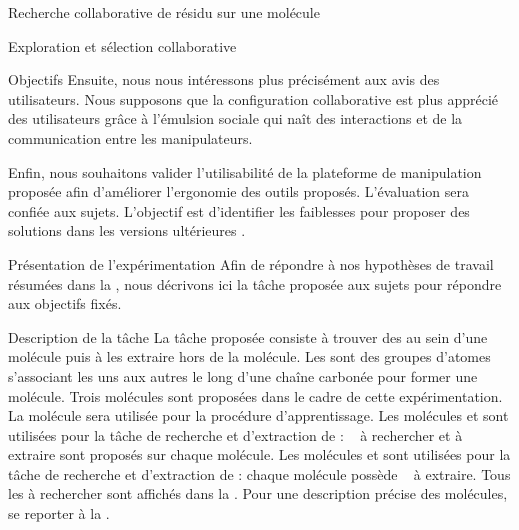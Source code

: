 \documentclass[myfrancais,ngerman,english,frenchb]{mythesis}
\begin{document}
\begin{mychapter}{Recherche collaborative de résidu sur une molécule}
\begin{mysection}{Exploration et sélection collaborative}
\begin{mysubsection}{Objectifs}
				Ensuite, nous nous intéressons plus précisément aux avis des utilisateurs.
				Nous supposons que la configuration collaborative est plus apprécié des utilisateurs grâce à l'émulsion sociale qui naît des interactions et de la communication entre les manipulateurs.

				Enfin, nous souhaitons valider l'utilisabilité de la plateforme de manipulation proposée afin d'améliorer l'ergonomie des outils proposés.
				L'évaluation sera confiée aux sujets.
				L'objectif est d'identifier les faiblesses pour proposer des solutions dans les versions ultérieures \myShaddock.
			\end{mysubsection}
		\end{mysection}
		\begin{mysection}{Présentation de l'expérimentation}
			Afin de répondre à nos hypothèses de travail résumées dans la , nous décrivons ici la tâche proposée aux sujets pour répondre aux objectifs fixés.
			\begin{mysubsection}{Description de la tâche}
				La tâche proposée consiste à trouver des  au sein d'une molécule puis à les extraire hors de la molécule.
				Les  sont des groupes d'atomes s'associant les uns aux autres le long d'une chaîne carbonée pour former une molécule.
				Trois molécules sont proposées dans le cadre de cette expérimentation.
				La molécule \myTRPZIPPER sera utilisée pour la procédure d'apprentissage.
				Les molécules \myTRPCAGE et \myPrion sont utilisées pour la tâche de recherche et d'extraction de  : ~ à rechercher et à extraire sont proposés sur chaque molécule.
				Les molécules \myTRPCAGE et \myPrion sont utilisées pour la tâche de recherche et d'extraction de  : chaque molécule possède ~ à extraire.
				Tous les  à rechercher sont affichés dans la .
				Pour une description précise des molécules, se reporter à la .


\end{mysubsection}
\end{mysection}
\end{mychapter}
\end{document}
